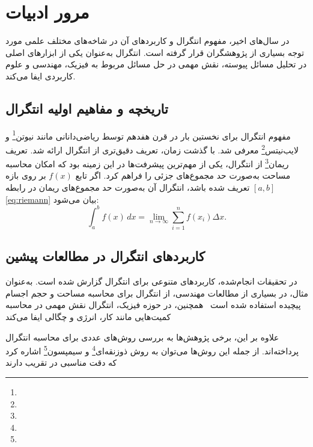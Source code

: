 \hypertarget{target:chap2}{}\chapter{مرور ادبیات}\label{chap:literature}
در سال‌های اخیر، مفهوم انتگرال و کاربردهای آن در شاخه‌های مختلف علمی مورد توجه بسیاری از پژوهشگران قرار گرفته است. انتگرال به‌عنوان یکی از ابزارهای اصلی در تحلیل مسائل پیوسته، نقش مهمی در حل مسائل مربوط به فیزیک، مهندسی و علوم کاربردی ایفا می‌کند.

\section{تاریخچه و مفاهیم اولیه انتگرال}
مفهوم انتگرال برای نخستین بار در قرن هفدهم توسط ریاضی‌دانانی مانند نیوتن\footnote{} و لایب‌نیتس\footnote{} معرفی شد. با گذشت زمان، تعریف دقیق‌تری از انتگرال ارائه شد. تعریف ریمان\footnote{} از انتگرال، یکی از مهم‌ترین پیشرفت‌ها در این زمینه بود که امکان محاسبه مساحت به‌صورت حد مجموع‌های جزئی را فراهم کرد. اگر تابع $f(x)$ بر روی بازه $[a,b]$ تعریف شده باشد، انتگرال آن به‌صورت حد مجموع‌های ریمان در رابطه \eqref{eq:riemann} بیان می‌شود:
\begin{equation}
	\int_{a}^{b} f(x) \, dx = \lim_{n \to \infty} \sum_{i=1}^{n} f(x_i) \Delta x.
	\label{eq:riemann}
\end{equation}

\section{کاربردهای انتگرال در مطالعات پیشین}
در تحقیقات انجام‌شده، کاربردهای متنوعی برای انتگرال گزارش شده است. به‌عنوان مثال، در بسیاری از مطالعات مهندسی، از انتگرال برای محاسبه مساحت و حجم اجسام پیچیده استفاده شده است~\cite{first} همچنین، در حوزه فیزیک، انتگرال نقش مهمی در محاسبه کمیت‌هایی مانند کار، انرژی و چگالی ایفا می‌کند~\cite{second}

علاوه بر این، برخی پژوهش‌ها به بررسی روش‌های عددی برای محاسبه انتگرال پرداخته‌اند. از جمله این روش‌ها می‌توان به روش ذوزنقه‌ای\footnote{} و سیمپسون\footnote{} اشاره کرد که دقت مناسبی در تقریب دارند~\cite{third}